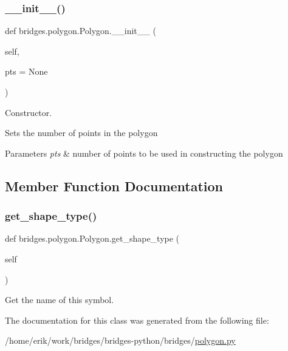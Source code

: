 \subsubsection{\texorpdfstring{\+\_\+\+\_\+init\+\_\+\+\_\+()}{\_\_init\_\_()}}
{\footnotesize\ttfamily def bridges.\+polygon.\+Polygon.\+\_\+\+\_\+init\+\_\+\+\_\+ (\begin{DoxyParamCaption}\item[{}]{self,  }\item[{}]{pts = {\ttfamily None} }\end{DoxyParamCaption})}



Constructor. 

Sets the number of points in the polygon


\begin{DoxyParams}{Parameters}
{\em pts} & number of points to be used in constructing the polygon \\
\hline
\end{DoxyParams}


\subsection{Member Function Documentation}
\mbox{\label{classbridges_1_1polygon_1_1_polygon_a4cf9417dcf182e095dc9da63db5356b4}} 
\subsubsection{\texorpdfstring{get\+\_\+shape\+\_\+type()}{get\_shape\_type()}}
{\footnotesize\ttfamily def bridges.\+polygon.\+Polygon.\+get\+\_\+shape\+\_\+type (\begin{DoxyParamCaption}\item[{}]{self }\end{DoxyParamCaption})}



Get the name of this symbol. 



The documentation for this class was generated from the following file\+:\begin{DoxyCompactItemize}
\item 
/home/erik/work/bridges/bridges-\/python/bridges/\hyperlink{polygon_8py}{polygon.\+py}\end{DoxyCompactItemize}
